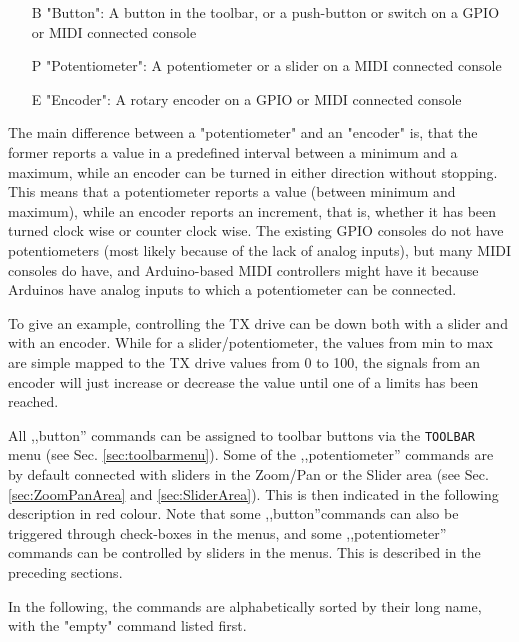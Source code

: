 \documentclass[12pt]{book}
\def\bltt#1{\texttt{\color{blue}#1}}
\begin{document}
\begin{itemize}[font=\texttt, left=0pt]
\item[B] {"Button": A button in the toolbar, or a push-button or switch on a GPIO or MIDI connected console}
\item[P] {"Potentiometer": A potentiometer or a slider on a MIDI connected console}
\item[E] {"Encoder": A rotary encoder on a GPIO or MIDI connected console}
\end{itemize}

The main difference between a "potentiometer" and an "encoder" is, that the former reports a
value in a predefined interval between a minimum and a maximum,
while
an encoder can be turned in either direction without stopping. This means that a potentiometer
reports a value (between minimum and maximum), while an encoder reports an increment,
that is, whether it has been turned clock wise or counter clock wise.
The existing GPIO consoles do not have potentiometers (most likely because of the lack of analog inputs),
but many MIDI consoles do have, and Arduino-based MIDI controllers might have it because Arduinos have
analog inputs to which a potentiometer can be connected.

To give an example, controlling the TX drive can be down both with a slider and with an encoder. While for
a slider/potentiometer, the values from min to max are simple mapped to the TX drive values from 0 to 100,
the signals from an encoder will just increase or decrease the value until one of a limits has been reached.

All ,,button'' commands can be assigned to toolbar buttons via the \bltt{TOOLBAR} menu
(see Sec. \ref{sec:toolbarmenu}). Some of the ,,potentiometer'' commands are by default connected
with sliders in the Zoom/Pan or the Slider area (see Sec. \ref{sec:ZoomPanArea} and \ref{sec:SliderArea}).
This is then indicated in the following description in red colour. Note that some ,,button''commands
can also be triggered through check-boxes in the menus, and some ,,potentiometer'' commands can be controlled
by sliders in the menus. This is described in the preceding sections.

In the following, the commands are alphabetically sorted by their long name, with the "empty" command listed
first.

\renewcommand{\belowrulesep}{0pt}
\renewcommand{\aboverulesep}{0pt}
\def\phcommand#1#2#3#4{
\begin{center}
\begin{tabular}{|p{7cm}|p{3cm}|p{1cm}|}
\toprule
\bltt{\large #1} & \texttt{\large #2} & \texttt{\large #3}$\phantom{\Big|}$ \\\cline{1-3}
\multicolumn{3}{|p{\textwidth}|}{#4} \\
\bottomrule
\end{tabular}
\end{center}
}
\end{document}
